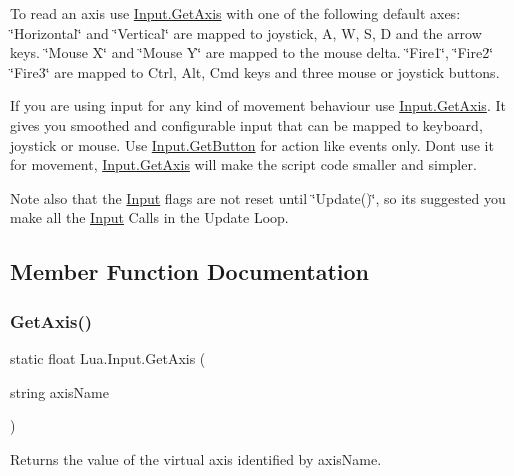 To read an axis use \mbox{\hyperlink{class_lua_1_1_input_a616e22e4f3b9c973c9763c10dc495395}{Input.\+Get\+Axis}} with one of the following default axes\+: \char`\"{}\+Horizontal\char`\"{} and \char`\"{}\+Vertical\char`\"{} are mapped to joystick, A, W, S, D and the arrow keys. \char`\"{}\+Mouse X\char`\"{} and \char`\"{}\+Mouse Y\char`\"{} are mapped to the mouse delta. \char`\"{}\+Fire1\char`\"{}, \char`\"{}\+Fire2\char`\"{} \char`\"{}\+Fire3\char`\"{} are mapped to Ctrl, Alt, Cmd keys and three mouse or joystick buttons. 

If you are using input for any kind of movement behaviour use \mbox{\hyperlink{class_lua_1_1_input_a616e22e4f3b9c973c9763c10dc495395}{Input.\+Get\+Axis}}. It gives you smoothed and configurable input that can be mapped to keyboard, joystick or mouse. Use \mbox{\hyperlink{class_lua_1_1_input_ac45bfbc1aaa71822f9dd32ee446e3e26}{Input.\+Get\+Button}} for action like events only. Don\textquotesingle{}t use it for movement, \mbox{\hyperlink{class_lua_1_1_input_a616e22e4f3b9c973c9763c10dc495395}{Input.\+Get\+Axis}} will make the script code smaller and simpler. 

Note also that the \mbox{\hyperlink{class_lua_1_1_input}{Input}} flags are not reset until \char`\"{}\+Update()\char`\"{}, so its suggested you make all the \mbox{\hyperlink{class_lua_1_1_input}{Input}} Calls in the Update Loop. 

\subsection{Member Function Documentation}
\mbox{\label{class_lua_1_1_input_a616e22e4f3b9c973c9763c10dc495395}} 
\subsubsection{\texorpdfstring{GetAxis()}{GetAxis()}}
{\footnotesize\ttfamily static float Lua.\+Input.\+Get\+Axis (\begin{DoxyParamCaption}\item[{string}]{axis\+Name }\end{DoxyParamCaption})\hspace{0.3cm}{\ttfamily [static]}}



Returns the value of the virtual axis identified by axis\+Name. 


